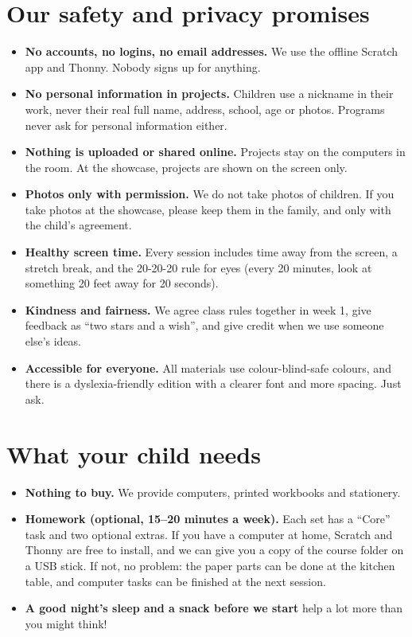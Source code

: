 \documentclass[level=1]{kidscode}
\begin{document}
\section{Our safety and privacy promises}
\begin{safety}
\begin{itemize}[itemsep=2pt]
  \item \textbf{No accounts, no logins, no email addresses.} We use the offline Scratch app and Thonny.
        Nobody signs up for anything.
  \item \textbf{No personal information in projects.} Children use a nickname in their work, never their
        real full name, address, school, age or photos. Programs never ask for personal information either.
  \item \textbf{Nothing is uploaded or shared online.} Projects stay on the computers in the room. At the
        showcase, projects are shown on the screen only.
  \item \textbf{Photos only with permission.} We do not take photos of children. If you take photos at
        the showcase, please keep them in the family, and only with the child's agreement.
  \item \textbf{Healthy screen time.} Every session includes time away from the screen, a stretch break,
        and the 20-20-20 rule for eyes (every 20 minutes, look at something 20 feet away for 20 seconds).
  \item \textbf{Kindness and fairness.} We agree class rules together in week 1, give feedback as
        \enquote{two stars and a wish}, and give credit when we use someone else's ideas.
  \item \textbf{Accessible for everyone.} All materials use colour-blind-safe colours, and there is a
        dyslexia-friendly edition with a clearer font and more spacing. Just ask.
\end{itemize}
\end{safety}

\section{What your child needs}
\begin{itemize}[itemsep=2pt]
  \item \textbf{Nothing to buy.} We provide computers, printed workbooks and stationery.
  \item \textbf{Homework (optional, 15--20 minutes a week).} Each set has a \enquote{Core} task and two
        optional extras. If you have a computer at home, Scratch and Thonny are free to install, and we can
        give you a copy of the course folder on a USB stick. If not, no problem: the paper parts can be done
        at the kitchen table, and computer tasks can be finished at the next session.
  \item \textbf{A good night's sleep and a snack before we start} help a lot more than you might think!
\end{itemize}
\end{document}
